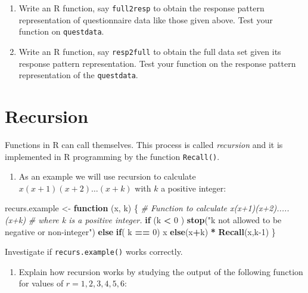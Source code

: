 \documentclass[
]{book}
\newenvironment{Shaded}{\begin{snugshade}}{\end{snugshade}}
\newcommand{\CommentTok}[1]{\textcolor[rgb]{0.56,0.35,0.01}{\textit{#1}}}
\newcommand{\ControlFlowTok}[1]{\textcolor[rgb]{0.13,0.29,0.53}{\textbf{#1}}}
\newcommand{\DecValTok}[1]{\textcolor[rgb]{0.00,0.00,0.81}{#1}}
\newcommand{\FunctionTok}[1]{\textcolor[rgb]{0.13,0.29,0.53}{\textbf{#1}}}
\newcommand{\NormalTok}[1]{#1}
\newcommand{\OtherTok}[1]{\textcolor[rgb]{0.56,0.35,0.01}{#1}}
\newcommand{\SpecialCharTok}[1]{\textcolor[rgb]{0.81,0.36,0.00}{\textbf{#1}}}
\newcommand{\StringTok}[1]{\textcolor[rgb]{0.31,0.60,0.02}{#1}}
\providecommand{\tightlist}{%
  \setlength{\itemsep}{0pt}\setlength{\parskip}{0pt}}
\begin{document}
\begin{enumerate}
\def\labelenumi{(\roman{enumi})}
\setcounter{enumi}{2}
\item
  Write an R function, say \texttt{full2resp} to obtain the response pattern representation of questionnaire data like those given above. Test your function on \texttt{questdata}.
\item
  Write an R function, say \texttt{resp2full} to obtain the full data set given its response pattern representation. Test your function on the response pattern representation of the \texttt{questdata}.
\end{enumerate}

\section{Recursion}\label{recursion}

Functions in R can call themselves. This process is called \emph{{recursion}} and it is implemented in R programming by the function \texttt{Recall()}.

\begin{enumerate}
\def\labelenumi{(\alph{enumi})}
\tightlist
\item
  As an example we will use recursion to calculate \(x(x+1)(x+2)\dots(x+k)\) with \(k\) a positive integer:
\end{enumerate}

\begin{Shaded}
\begin{Highlighting}[]
\NormalTok{recurs.example }\OtherTok{\textless{}{-}} \ControlFlowTok{function}\NormalTok{ (x, k) }
\NormalTok{\{ }\CommentTok{\# Function to calculate x(x+1)(x+2).....(x+k)}
  \CommentTok{\# where k is a positive integer.}
     \ControlFlowTok{if}\NormalTok{ (k }\SpecialCharTok{\textless{}} \DecValTok{0}\NormalTok{ ) }
      \FunctionTok{stop}\NormalTok{(}\StringTok{"k not allowed to be negative or non{-}integer"}\NormalTok{)}
    \ControlFlowTok{else} \ControlFlowTok{if}\NormalTok{( k }\SpecialCharTok{==} \DecValTok{0}\NormalTok{) x}
       \ControlFlowTok{else}\NormalTok{(x}\SpecialCharTok{+}\NormalTok{k) }\SpecialCharTok{*} \FunctionTok{Recall}\NormalTok{(x,k}\DecValTok{{-}1}\NormalTok{)}
\NormalTok{   \}}
\end{Highlighting}
\end{Shaded}

Investigate if \texttt{recurs.example()} works correctly.

\begin{enumerate}
\def\labelenumi{(\alph{enumi})}
\setcounter{enumi}{1}
\tightlist
\item
  Explain how recursion works by studying the output of the following function for values of \(r = 1, 2, 3, 4, 5, 6\):
\end{enumerate}
\end{document}
